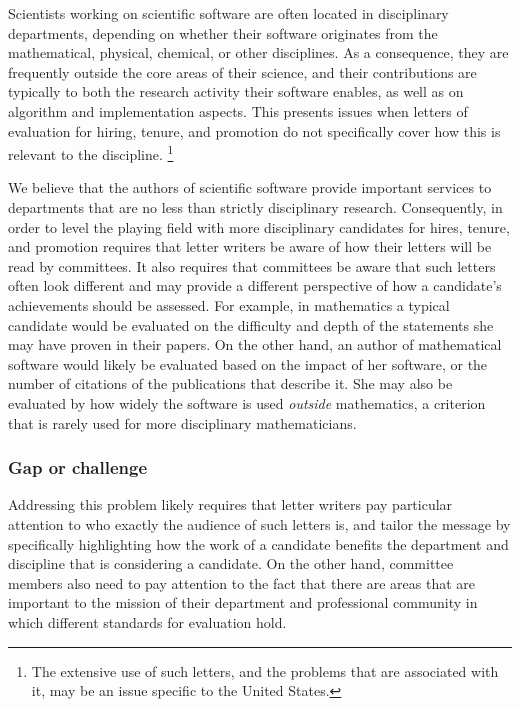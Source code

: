 Scientists working on scientific software are often located in
disciplinary departments, depending on whether their software
originates from the mathematical, physical, chemical, or other
disciplines. As a consequence, they are frequently outside the core
areas of their science, and their contributions are typically to both
the research activity their software enables, as well as on
algorithm and implementation aspects. This presents issues when
letters of evaluation for hiring, tenure, and promotion do not specifically
cover how this is relevant to the discipline.%
\footnote{The extensive use of such letters, and the problems that are
  associated with it, may be an issue specific to the United States.}

We believe that the authors of scientific software provide important
services to departments that are no less than strictly disciplinary
research. Consequently, in order to level the playing field with more
disciplinary candidates for hires, tenure, and promotion requires that
letter writers be aware of how their letters will be read by
committees. It also requires that committees be aware that such
letters often look different and may provide a different perspective
of how a candidate's achievements should be assessed. For example, in
mathematics a typical candidate would be evaluated on the difficulty
and depth of the statements she may have proven in their papers. On
the other hand, an author of mathematical software would likely be
evaluated based on the impact of her software, or the number of citations of
the publications that describe it. She may also be evaluated by how
widely the software is used \textit{outside} mathematics, a criterion
that is rarely used for more disciplinary mathematicians.

\subsubsection{Gap or challenge}

Addressing this problem likely requires that letter writers pay
particular attention to who exactly the audience of such letters is,
and tailor the message by specifically highlighting how the work of a
candidate benefits the department and discipline that is considering a
candidate. On the other hand, committee members also need to pay
attention to the fact that there are areas that are important to the mission of
their department and professional community in which different
standards for evaluation hold.


